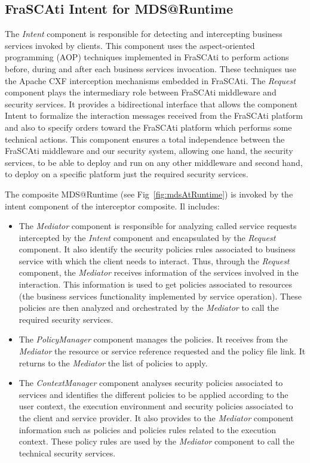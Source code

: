 \documentclass[runningheads,a4paper]{llncs}
\begin{document}
\subsection{FraSCAti Intent for MDS@Runtime}
 The \emph{Intent} component is responsible for detecting and intercepting business services invoked  by clients. This component uses the aspect-oriented programming (AOP) techniques implemented in FraSCAti to perform actions before, during and after each business services invocation. These techniques use the Apache CXF interception mechanisms embedded in FraSCAti. 
   The \emph{Request} component plays the intermediary role between FraSCAti middleware and security services. It provides a bidirectional interface that allows the component Intent to formalize the interaction messages received from the FraSCAti platform and also to specify orders toward the FraSCAti platform which performs some technical actions. This component ensures a total independence between the FraSCAti middleware and our security system, allowing one hand, the security services,  to be able to deploy and run on any other middleware and second hand, to deploy on a specific platform just the required security services.


The composite MDS@Runtime  (see Fig~\ref{fig:mdsAtRuntime}) is invoked by the intent component of the interceptor composite. Il includes:


\begin{itemize}
\settowidth{\leftmargin}{{\Large$\square$}}\advance\leftmargin{}
\itemsep8pt\relax
\renewcommand\labelitemi{{\lower1.5pt\hbox{\Large$\square$}}}

\item The \emph{Mediator} component is responsible for analyzing called service requests intercepted by the  \emph{Intent} component and  encapsulated by the \emph{Request} component. It also identify the security policies rules associated to business service with which the client needs to interact. Thus, through the \emph{Request} component, the \emph{Mediator} receives information of the services involved in the interaction. This information is used to get policies associated to resources (the business services functionality implemented by service operation). These policies are then analyzed and orchestrated by the \emph{Mediator} to call the required security services.
\item The \emph{PolicyManager} component manages the policies. It receives from the \emph{Mediator} the resource or service reference requested and the policy file link. It returns to the \emph{Mediator} the list of policies to apply.
\item The \emph{ContextManager} component analyses security policies associated to services and identifies the different policies to be applied according to the user context, the execution environment and security policies associated to the client and service provider. It also provides to the \emph{Mediator} component information such as policies and policies rules related to the execution context. These policy rules are used by the \emph{Mediator} component to call the technical security services.
\end{itemize}
\end{document}

